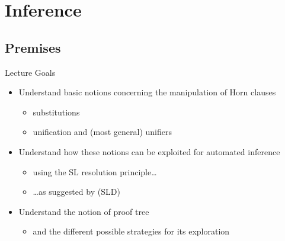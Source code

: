 \documentclass[presentation]{beamer}\mode<presentation>{\usetheme{AMSBolognaFC}}
\begin{document}
\section{Inference}

\subsection{Premises}

\begin{frame}{Lecture Goals}
    \begin{itemize}
        \item Understand basic notions concerning the \alert{manipulation} of Horn clauses
        \begin{itemize}
            \item substitutions
            \item unification and (most general) unifiers
        \end{itemize}

        \vfill

        \item Understand how these notions can be exploited for \alert{automated inference}
        \begin{itemize}
            \item using the SL resolution principle\ldots
            \item \ldots as suggested by \cite{KowVan1970} (SLD)
        \end{itemize}

        \vfill

        \item Understand the notion of \alert{proof tree}
        \begin{itemize}
            \item and the different possible strategies for its \alert{exploration}
        \end{itemize}
    \end{itemize}
\end{frame}

\end{document}
